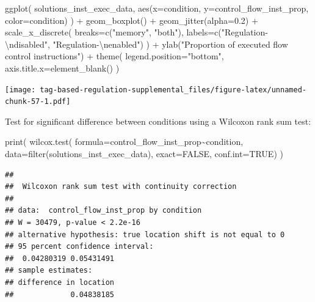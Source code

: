 \documentclass[
]{book}
\newenvironment{Shaded}{\begin{snugshade}}{\end{snugshade}}
\newcommand{\AttributeTok}[1]{\textcolor[rgb]{0.77,0.63,0.00}{#1}}
\newcommand{\ConstantTok}[1]{\textcolor[rgb]{0.00,0.00,0.00}{#1}}
\newcommand{\FloatTok}[1]{\textcolor[rgb]{0.00,0.00,0.81}{#1}}
\newcommand{\FunctionTok}[1]{\textcolor[rgb]{0.00,0.00,0.00}{#1}}
\newcommand{\NormalTok}[1]{#1}
\newcommand{\SpecialCharTok}[1]{\textcolor[rgb]{0.00,0.00,0.00}{#1}}
\newcommand{\StringTok}[1]{\textcolor[rgb]{0.31,0.60,0.02}{#1}}
\begin{document}
\begin{Shaded}
\begin{Highlighting}[]
\FunctionTok{ggplot}\NormalTok{( solutions\_inst\_exec\_data, }\FunctionTok{aes}\NormalTok{(}\AttributeTok{x=}\NormalTok{condition, }\AttributeTok{y=}\NormalTok{control\_flow\_inst\_prop, }\AttributeTok{color=}\NormalTok{condition) ) }\SpecialCharTok{+}
  \FunctionTok{geom\_boxplot}\NormalTok{() }\SpecialCharTok{+}
  \FunctionTok{geom\_jitter}\NormalTok{(}\AttributeTok{alpha=}\FloatTok{0.2}\NormalTok{) }\SpecialCharTok{+}
  \FunctionTok{scale\_x\_discrete}\NormalTok{(}
    \AttributeTok{breaks=}\FunctionTok{c}\NormalTok{(}\StringTok{"memory"}\NormalTok{, }\StringTok{"both"}\NormalTok{),}
    \AttributeTok{labels=}\FunctionTok{c}\NormalTok{(}\StringTok{"Regulation{-}}\SpecialCharTok{\textbackslash{}n}\StringTok{disabled"}\NormalTok{, }\StringTok{"Regulation{-}}\SpecialCharTok{\textbackslash{}n}\StringTok{enabled"}\NormalTok{)}
\NormalTok{  ) }\SpecialCharTok{+}
  \FunctionTok{ylab}\NormalTok{(}\StringTok{"Proportion of executed flow control instructions"}\NormalTok{) }\SpecialCharTok{+}
  \FunctionTok{theme}\NormalTok{(}
    \AttributeTok{legend.position=}\StringTok{"bottom"}\NormalTok{,}
    \AttributeTok{axis.title.x=}\FunctionTok{element\_blank}\NormalTok{()}
\NormalTok{  )}
\end{Highlighting}
\end{Shaded}

\texttt{[image: tag-based-regulation-supplemental\_files/figure-latex/unnamed-chunk-57-1.pdf]}

Test for significant difference between conditions using a Wilcoxon rank sum test:

\begin{Shaded}
\begin{Highlighting}[]
\FunctionTok{print}\NormalTok{(}
  \FunctionTok{wilcox.test}\NormalTok{(}
    \AttributeTok{formula=}\NormalTok{control\_flow\_inst\_prop}\SpecialCharTok{\textasciitilde{}}\NormalTok{condition,}
    \AttributeTok{data=}\FunctionTok{filter}\NormalTok{(solutions\_inst\_exec\_data),}
    \AttributeTok{exact=}\ConstantTok{FALSE}\NormalTok{,}
    \AttributeTok{conf.int=}\ConstantTok{TRUE}\NormalTok{)}
\NormalTok{)}
\end{Highlighting}
\end{Shaded}

\begin{verbatim}
## 
##  Wilcoxon rank sum test with continuity correction
## 
## data:  control_flow_inst_prop by condition
## W = 30479, p-value < 2.2e-16
## alternative hypothesis: true location shift is not equal to 0
## 95 percent confidence interval:
##  0.04280319 0.05431491
## sample estimates:
## difference in location 
##             0.04838185
\end{verbatim}
\end{document}

